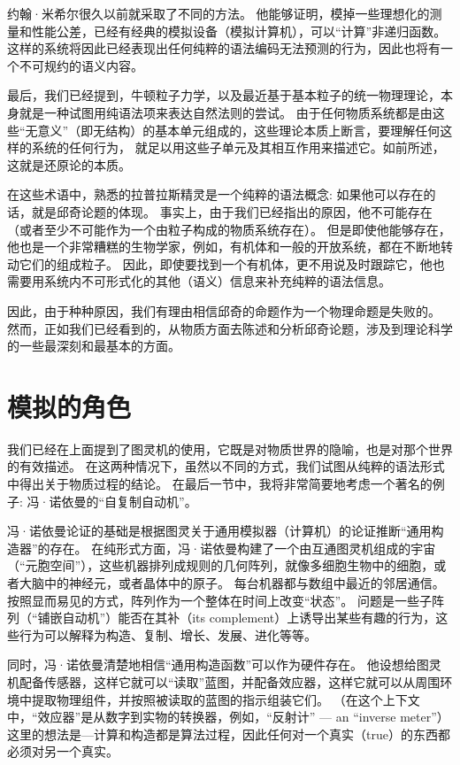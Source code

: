 \documentclass[a4paper,12pt]{article}
\begin{document}
约翰·米希尔很久以前就采取了不同的方法\cite{MyhillJ1966}。
他能够证明，模掉一些理想化的测量和性能公差，已经有经典的模拟设备（模拟计算机），可以“计算”非递归函数。
这样的系统将因此已经表现出任何纯粹的语法编码无法预测的行为，因此也将有一个不可规约的语义内容。

最后，我们已经提到，牛顿粒子力学，以及最近基于基本粒子的统一物理理论，本身就是一种试图用纯语法项来表达自然法则的尝试。
由于任何物质系统都是由这些“无意义”（即无结构）的基本单元组成的，这些理论本质上断言，要理解任何这样的系统的任何行为，
就足以用这些子单元及其相互作用来描述它。如前所述，这就是还原论的本质。

在这些术语中，熟悉的拉普拉斯精灵是一个纯粹的语法概念: 如果他可以存在的话，就是邱奇论题的体现。
事实上，由于我们已经指出的原因，他不可能存在（或者至少不可能作为一个由粒子构成的物质系统存在）。
但是即使他能够存在，他也是一个非常糟糕的生物学家，例如，有机体和一般的开放系统，都在不断地转动它们的组成粒子。
因此，即使要找到一个有机体，更不用说及时跟踪它，他也需要用系统内不可形式化的其他（语义）信息来补充纯粹的语法信息。

因此，由于种种原因，我们有理由相信邱奇的命题作为一个物理命题是失败的。
然而，正如我们已经看到的，从物质方面去陈述和分析邱奇论题，涉及到理论科学的一些最深刻和最基本的方面。

\section{模拟的角色}

我们已经在上面提到了图灵机的使用，它既是对物质世界的隐喻，也是对那个世界的有效描述。
在这两种情况下，虽然以不同的方式，我们试图从纯粹的语法形式中得出关于物质过程的结论。
在最后一节中，我将非常简要地考虑一个著名的例子: 冯·诺依曼的“自复制自动机”\cite{BurksA1966}\cite{ArbibMA1988}。

冯·诺依曼论证的基础是根据图灵关于通用模拟器（计算机）的论证推断“通用构造器”的存在。
在纯形式方面，冯·诺依曼构建了一个由互通图灵机组成的宇宙（“元胞空间”），这些机器排列成规则的几何阵列，就像多细胞生物中的细胞，或者大脑中的神经元，或者晶体中的原子。
每台机器都与数组中最近的邻居通信。按照显而易见的方式，阵列作为一个整体在时间上改变“状态”。
问题是一些子阵列（“铺嵌自动机”）能否在其补（its complement）上诱导出某些有趣的行为，这些行为可以解释为构造、复制、增长、发展、进化等等。

同时，冯·诺依曼清楚地相信“通用构造函数”可以作为硬件存在。
他设想给图灵机配备传感器，这样它就可以“读取”蓝图，并配备效应器，这样它就可以从周围环境中提取物理组件，并按照被读取的蓝图的指示组装它们。
（在这个上下文中，“效应器”是从数字到实物的转换器，例如，“反射计” — an “inverse meter”）
这里的想法是—计算和构造都是算法过程，因此任何对一个真实（true）的东西都必须对另一个真实。
\end{document}
